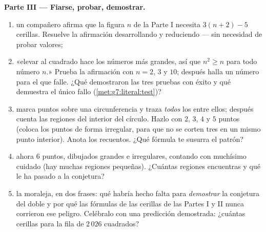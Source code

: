 \begin{problem}
\medskip
\noindent\textbf{Parte III --- Fiarse, probar, demostrar.}
\begin{enumerate}[resume]
  \item un compañero afirma que la figura $n$ de la Parte I necesita
        $3(n + 2) - 5$ cerillas. Resuelve la afirmación desarrollando y
        reduciendo --- sin necesidad de probar valores;
  \item «elevar al cuadrado hace los números más grandes, así que $n^2 \geq n$ para
        todo número $n$.» Prueba la afirmación con $n = 2$, $3$ y
        $10$; después halla un número para el que falle. ¿Qué demostraron las
        tres pruebas con éxito y qué demuestra el único
        fallo (\cref{met:g7:literal:test})?
  \item marca puntos sobre una circunferencia y traza \emph{todos} los 
        entre ellos; después cuenta las regiones del interior del círculo.
        Hazlo con $2$, $3$, $4$ y $5$ puntos (coloca los puntos
        de forma irregular, para que no se corten tres  en un mismo
        punto interior). Anota los recuentos. ¿Qué fórmula te
        susurra el patrón?
  \item ahora $6$ puntos, dibujados grandes e irregulares, contando con
        muchísimo cuidado (hay muchas regiones pequeñas). ¿Cuántas
        regiones encuentras y qué le ha pasado a la
        conjetura?
  \item la moraleja, en dos frases: qué habría hecho falta
        para \emph{demostrar} la conjetura del doble y por qué las
        fórmulas de las cerillas de las Partes I y II nunca corrieron ese
        peligro. Celébralo con una predicción demostrada: ¿cuántas
        cerillas para la fila de $2\,026$ cuadrados?
\end{enumerate}
\end{problem}
